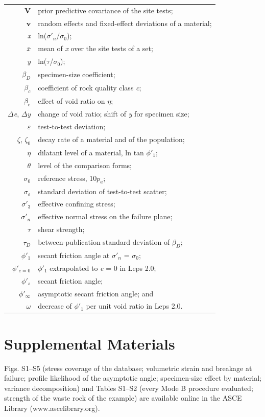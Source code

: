 \documentclass[Journal,letterpaper]{ascelike-new}
\begin{document}
\begin{longtable}{@{}r@{\hspace{1em}=\hspace{1em}}p{5.0in}@{}}
$\mathbf{V}$ & prior predictive covariance of the site tests; \\
$\mathbf{v}$ & random effects and fixed-effect deviations of a material; \\
\textit{x} & ln($\sigma'_n$/$\sigma_0$); \\
$\bar{x}$ & mean of \textit{x} over the site tests of a set; \\
\textit{y} & ln($\tau$/$\sigma_0$); \\
$\beta_D$ & specimen-size coefficient; \\
$\beta_c$ & coefficient of rock quality class \textit{c}; \\
$\beta_e$ & effect of void ratio on $\eta$; \\
$\Delta$\textit{e}, $\Delta$\textit{y} & change of void ratio; shift of \textit{y} for specimen size; \\
$\varepsilon$ & test-to-test deviation; \\
$\zeta$, $\zeta_0$ & decay rate of a material and of the population; \\
$\eta$ & dilatant level of a material, ln tan $\phi'_1$; \\
$\theta$ & level of the comparison forms; \\
$\sigma_0$ & reference stress, 10$p_a$; \\
$\sigma_\varepsilon$ & standard deviation of test-to-test scatter; \\
$\sigma'_3$ & effective confining stress; \\
$\sigma'_n$ & effective normal stress on the failure plane; \\
$\tau$ & shear strength; \\
$\tau_D$ & between-publication standard deviation of $\beta_D$; \\
$\phi'_1$ & secant friction angle at $\sigma'_n$ = $\sigma_0$; \\
$\phi'_{e=0}$ & $\phi'_1$ extrapolated to \textit{e} = 0 in Leps 2.0; \\
$\phi'_s$ & secant friction angle; \\
$\phi'_\infty$ & asymptotic secant friction angle; and \\
$\omega$ & decrease of $\phi'_1$ per unit void ratio in Leps 2.0. \\
\end{longtable}
\section{Supplemental Materials}
\noindent Figs. S1--S5 (stress coverage of the database; volumetric strain and breakage at failure; profile likelihood of the asymptotic angle; specimen-size effect by material; variance decomposition) and Tables S1--S2 (every Mode B procedure evaluated; strength of the waste rock of the example) are available online in the ASCE Library (www.ascelibrary.org).
\end{document}
